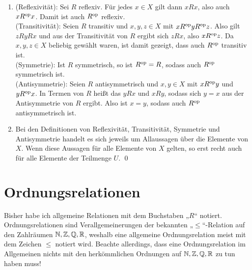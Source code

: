 \begin{bew} \quad
    \begin{enumerate}
    \item (Reflexivität): Sei $R$ reflexiv. Für jedes $x\in X$ gilt dann  $xRx$, also auch $xR^{\mathrm{op}} x$. Damit ist auch $R^{\mathrm{op}}$ reflexiv. \\[0.5em]
    (Transitivität): Seien $R$ transitiv und $x,y,z\in X$ mit $xR^{\mathrm{op}} yR^{\mathrm{op}} z$. Also gilt $zRyRx$ und aus der Transitivität von $R$ ergibt sich $zRx$, also $xR^{\mathrm{op}} z$. Da $x,y,z\in X$ beliebig gewählt waren, ist damit gezeigt, dass auch $R^{\mathrm{op}}$ transitiv ist. \\[0.5em]
    (Symmetrie): Ist $R$ symmetrisch, so ist $R^{\mathrm{op}}=R$, sodass auch $R^{\mathrm{op}}$ symmetrisch ist. \\[0.5em]
    (Antisymmetrie): Seien $R$ antisymmetrisch und $x,y\in X$ mit $x R^{\mathrm{op}} y$ und $y R^{\mathrm{op}} x$. In Termen von $R$ heißt das $y Rx$ und $x Ry$, sodass sich $y=x$ aus der Antisymmetrie von $R$ ergibt. Also ist $x=y$, sodass auch $R^{\mathrm{op}}$ antisymmetrisch ist.
    \item Bei den Definitionen von Reflexivität, Transitivität, Symmetrie und Antisymmetrie handelt es sich jeweils um Allaussagen über die Elemente von $X$. Wenn diese Aussagen für alle Elemente von $X$ gelten, so erst recht auch für alle Elemente der Teilmenge $U$. \qed
    \end{enumerate}
\end{bew}





\section{Ordnungsrelationen}


\begin{nota}
    Bisher habe ich allgemeine Relationen mit dem Buchstaben „$R$“ notiert. Ordnungsrelationen sind Verallgemeinerungen der bekannten „$\le$“-Relation auf den Zahlräumen $\mathbb N,\mathbb Z,\mathbb Q,\mathbb R$, weshalb eine allgemeine Ordnungsrelation meist mit dem Zeichen $\le$ notiert wird. Beachte allerdings, dass eine Ordnungsrelation im Allgemeinen nichts mit den herkömmlichen Ordnungen auf $\mathbb N,\mathbb Z,\mathbb Q,\mathbb R$ zu tun haben muss!
\end{nota}


